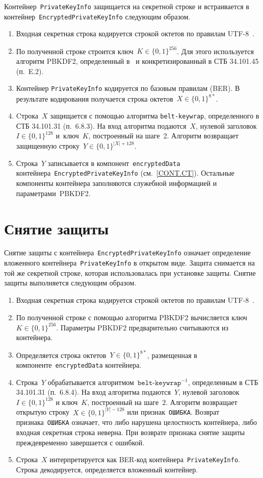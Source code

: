 Контейнер~\texttt{PrivateKeyInfo} защищается на секретной строке и
встраивается в контейнер~\texttt{EncryptedPrivateKeyInfo} следующим
образом.
\begin{enumerate}
\item
Входная секретная строка кодируется строкой октетов по правилам 
UTF-8~\cite{UTF8}. 
\item
По полученной строке строится ключ~$K\in\{0,1\}^{256}$.
Для этого используется алгоритм PBKDF2, определенный в~\cite{PKCS5} и 
конкретизированный в СТБ 34.101.45 (п.~E.2).
\item
Контейнер \texttt{PrivateKeyInfo} кодируется по базовым правилам (BER).
В результате кодирования получается строка октетов~$X\in\{0,1\}^{8*}$.
\item
Cтрока~$X$ защищается с помощью алгоритма \texttt{belt-keywrap}, 
определенного в СТБ 34.101.31 (п.~6.8.3). 
На вход алгоритма подаются~$X$, нулевой заголовок~$I\in\{0,1\}^{128}$
и~ключ~$K$, построенный на шаге~2. Алгоритм возвращает защищенную 
строку~$Y\in\{0,1\}^{|X|+128}$. 
\item
Строка~$Y$ записывается в компонент~\texttt{encryptedData}
контейнера~\texttt{EncryptedPrivateKeyInfo} (см.~\ref{CONT.CT}).
Остальные компоненты контейнера
заполняются служебной информацией и параметрами~PBKDF2.
\end{enumerate}

\section{Снятие защиты}\label{CONT.Unwrap}

Снятие защиты с контейнера~\texttt{EncryptedPrivateKeyInfo} 
означает определение вложенного контейнера~\texttt{PrivateKeyInfo} 
в открытом виде. Защита снимается на той же секретной строке, которая 
использовалась при установке защиты. 
Снятие защиты выполняется следующим образом.
\begin{enumerate}
\item
Входная секретная строка кодируется строкой октетов по правилам  
UTF-8~\cite{UTF8}. 
\item
По полученной строке с помощью алгоритма PBKDF2
вычисляется ключ~$K\in\{0,1\}^{256}$.
Параметры PBKDF2 предварительно считываются из контейнера.
\item
Определяется строка октетов~$Y\in\{0,1\}^{8*}$, размещенная в 
компоненте~\texttt{encryptedData} контейнера. 
\item
Строка~$Y$ обрабатывается алгоритмом~$\texttt{belt-keywrap}^{-1}$, определенным 
в СТБ 34.101.31 (п.~6.8.4). На вход алгоритма подаются~$Y$, 
нулевой заголовок~$I\in\{0,1\}^{128}$ и ключ~$K$, построенный на шаге~$2$.
Алгоритм возвращает открытую строку~$X\in\{0,1\}^{|Y|-128}$ или 
признак~\texttt{ОШИБКА}. Возврат признака~\texttt{ОШИБКА} означает, что 
либо нарушена целостность контейнера, либо входная секретная строка неверна.  
При возврате признака снятие защиты преждевременно завершается с ошибкой.
\item
Строка~$X$ интерпретируется как BER-код 
контейнера~\texttt{PrivateKeyInfo}. Строка декодируется, определяется 
вложенный контейнер. 
\end{enumerate}

